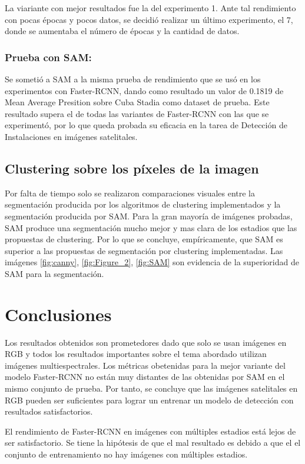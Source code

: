 \documentclass[article]{llncs}
\begin{document}
La viariante con mejor resultados fue la del experimento 1. Ante tal rendimiento con pocas \'epocas y pocos datos, se decidió 
realizar un \'ultimo experimento, el 7, donde se aumentaba el n\'umero de \'epocas y la cantidad de datos.

\subsubsection{Prueba con SAM:} Se someti\'o a SAM a la misma prueba de rendimiento que se us\'o en los experimentos con 
Faster-RCNN, dando como resultado un valor de 0.1819 de Mean Average Presition sobre Cuba Stadia como dataset de prueba.
Este resultado supera el de todas las variantes de Faster-RCNN con las que se experiment\'o, por lo que queda probada su eficacia 
en la tarea de Detección de Instalaciones en im\'agenes satelitales.

\subsection{Clustering sobre los p\'ixeles de la imagen}

Por falta de tiempo solo se realizaron comparaciones visuales entre la segmentación producida por los algoritmos de clustering 
implementados y la segmentación producida por SAM. Para la gran mayor\'ia de im\'agenes probadas, SAM produce 
una segmentación mucho mejor y mas clara de los estadios que las propuestas de clustering. Por lo que se concluye, 
emp\'iricamente, que SAM es superior a las propuestas de segmentación por clustering implementadas. Las im\'agenes 
\ref{fig:canny}, \ref{fig:Figure_2}, \ref{fig:SAM} son evidencia de la superioridad de SAM para la segmentación.

\section{Conclusiones}
Los resultados obtenidos son prometedores dado que solo se usan im\'agenes en RGB y todos los resultados importantes 
sobre el tema abordado utilizan im\'agenes multiespectrales. Los m\'etricas obetenidas para la mejor variante del modelo 
Faster-RCNN no est\'an muy distantes de las obtenidas por SAM en el mismo conjunto de prueba. Por tanto, se concluye 
que las im\'agenes satelitales en RGB pueden ser suficientes para lograr un entrenar un modelo de detección con resultados 
satisfactorios.

El rendimiento de Faster-RCNN en im\'agenes con m\'ultiples estadios est\'a lejos de ser satisfactorio. Se tiene la 
hip\'otesis de que el mal resultado es debido a que el el conjunto de entrenamiento no hay im\'agenes con m\'ultiples estadios.
\end{document}
